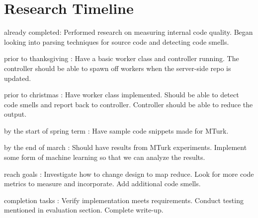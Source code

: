 \documentclass{sig-alternate}
\begin{document}
\section{Research Timeline}
\label{sec:research_timeline}
\begin{itemize*}
	\item {\sc already completed}: Performed research on measuring internal code quality. Began looking into parsing techniques for source code and detecting code smells.\vspace{3pt}
	\item {\sc prior to thanksgiving} : Have a basic worker class and controller running. The controller should be able to spawn off workers when the server-side repo is updated.\vspace{3pt}
	\item {\sc prior to christmas} : Have worker class implemented. Should be able to detect code smells and report back to controller. Controller should be able to reduce the output.\vspace{3pt}
\item {\sc by the start of spring term} : Have sample code snippets made for MTurk.\vspace{3pt}	
\item {\sc by the end of march} : Should have results from MTurk experiments. Implement some form of machine learning so that we can analyze the results.\vspace{3pt}
\item {\sc reach goals} : Investigate how to change design to map reduce. Look for more code metrics to measure and incorporate. Add additional code smells. \vspace{3pt}
\item {\sc completion tasks} : Verify implementation meets requirements. Conduct testing mentioned in evaluation section. Complete write-up.\vspace{3pt}
\end{itemize*}


\vspace{175pt}



\end{document}
